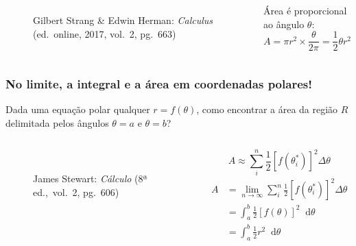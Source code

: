 \documentclass[pdftex, brazil, aspectratio=169]{beamer}
\newcommand*\diff{\mathop{}\!\mathrm{d}}
\begin{document}
\begin{frame}[t]
\begin{columns}
\begin{figure}[H]
\begin{center}
        \footnotesize{Gilbert Strang \& Edwin Herman: \emph{Calculus}
          (ed.\ online, 2017, vol.\ 2, pg.\ 663)}
      \end{center}
  \end{figure}
  Área é proporcional ao ângulo $\theta$:
  \begin{equation}
    A = \pi r^2 \times \frac{\theta}{2\pi} = \frac{1}{2}\theta r^2
  \end{equation}
  \end{columns}
\end{frame}

\begin{frame}[t]
  \frametitle{No limite, a integral e a área em coordenadas polares!}
  Dada uma equação polar qualquer $r = f(\theta)$, como encontrar a
  área da região $R$ delimitada pelos ângulos $\theta = a$ e $\theta =
  b$?
  \begin{columns}
    \centering
  \begin{figure}[H]
    \begin{center}
      \label{fig:int1-27b}
      \\
      \footnotesize{James Stewart: \emph{Cálculo} (8ª ed.,\ vol.\ 2, pg.\ 606)}
    \end{center}
  \end{figure}
  \centering
  \begin{equation}
    A \approx \sum_i^n \frac{1}{2}\left[f(\theta_i^*)\right]^2 \Delta \theta
  \end{equation}
  \vspace{0.5cm}
  \begin{equation}
    \begin{split}
    A &= \lim_{n \to \infty} \sum_i^n
    \frac{1}{2}\left[f(\theta_i^*)\right]^2 \Delta \theta\\
    &= \int_a^b \frac{1}{2}\left[f(\theta)\right]^2 \diff \theta\\
    &= \int_a^b \frac{1}{2}r^2 \diff \theta
    \end{split}
  \end{equation}
  \end{columns}
\end{frame}
\end{document}

